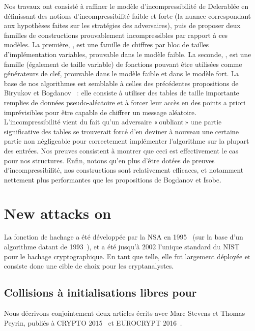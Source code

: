 Nos travaux ont consisté à raffiner le modèle d'incompressibilité de Delerablée \etal en définissant des notions d'incompressibilité faible et forte
(la nuance  correspondant aux hypothèses faites sur les stratégies des adversaires), puis de proposer deux familles de constructions
prouvablement incompressibles par rapport à ces modèles. La première, \pc, est une famille de chiffres par bloc de tailles d'implémentation variables, prouvable dans le modèle
faible. La seconde, \cdb, est une famille (également de taille variable) de fonctions
pouvant être utilisées comme générateurs de clef, prouvable dans le modèle faible et dans le modèle fort. La base de nos algorithmes est semblable à celles des précédentes propositions de Biryukov \etal
et Bogdanov \etal~: elle consiste à utiliser des tables de taille importante remplies de données pseudo-aléatoire et à forcer leur accès en des points a priori imprévisibles pour être capable de
chiffrer un message aléatoire. L'incompressibilité vient du fait qu'un adversaire «\,oubliant\,» une partie significative des tables se trouverait forcé d'en deviner à nouveau une certaine partie
non négligeable
pour correctement implémenter l'algorithme sur la plupart des entrées. Nos preuves consistent à montrer que ceci est effectivement le cas pour nos structures. Enfin, notons qu'en plus d'être
dotées de preuves d'incompressibilité, nos constructions sont relativement efficaces, et notamment nettement plus performantes que les propositions de Bogdanov et Isobe.

\section[Nouvelles attaques sur la fonction de hachage \shaone]{New attacks on \shaone}

La fonction de hachage \shaone a été développée par la NSA en 1995~\cite{Nist-SHA1} (sur la base d'un algorithme datant de 1993~\cite{Nist-SHA0}), et a été jusqu'à 2002 l'unique standard du NIST pour
le hachage cryptographique. En tant que telle, elle fut largement déployée et consiste donc une cible de choix pour les cryptanalystes.

\subsection{Collisions à initialisations libres pour \shaone \cite{DBLP:conf/crypto/KarpmanPS15,DBLP:conf/eurocrypt/StevensKP16}}

Nous décrivons conjointement deux articles écrits avec Marc Stevens et Thomas Peyrin, publiés à CRYPTO 2015~\cite{DBLP:conf/crypto/KarpmanPS15} et EUROCRYPT 2016~\cite{DBLP:conf/eurocrypt/StevensKP16}.

